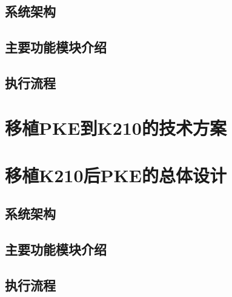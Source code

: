 \subsection{系统架构}

\subsection{主要功能模块介绍}

\subsection{执行流程}

\section{移植PKE到K210的技术方案}

\section{移植K210后PKE的总体设计}

\subsection{系统架构}

\subsection{主要功能模块介绍}

\subsection{执行流程}
